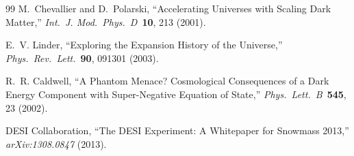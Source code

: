 \documentclass[12pt,letterpaper]{article}
\begin{document}
\begin{thebibliography}{99}
M.~Chevallier and D.~Polarski,
``Accelerating Universes with Scaling Dark Matter,''
\textit{Int.\ J. Mod.\ Phys.\ D}\ \textbf{10}, 213 (2001).

E.~V. Linder,
``Exploring the Expansion History of the Universe,''
\textit{Phys.\ Rev.\ Lett.}\ \textbf{90}, 091301 (2003).

R.~R. Caldwell,
``A Phantom Menace? Cosmological Consequences of a Dark Energy Component with Super-Negative Equation of State,''
\textit{Phys.\ Lett.\ B}\ \textbf{545}, 23 (2002).

DESI Collaboration,
``The DESI Experiment: A Whitepaper for Snowmass 2013,''
\textit{arXiv:1308.0847} (2013).

\end{thebibliography}
\end{document}
